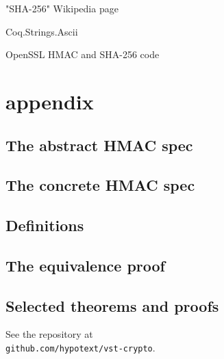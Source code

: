 \documentclass[twocolumn,showpacs,%
  nofootinbib,aps,superscriptaddress,%
  eqsecnum,prd,notitlepage,showkeys,10pt]{revtex4-1}
\begin{document}
"SHA-256" Wikipedia page

Coq.Strings.Ascii

OpenSSL HMAC and SHA-256 code


\section{appendix}

\subsection{The abstract HMAC spec}



\subsection{The concrete HMAC spec}



\subsection{Definitions}







\subsection{The equivalence proof}



\subsection{Selected theorems and proofs}

See the repository at \\ \verb|github.com/hypotext/vst-crypto|.
\end{document}
